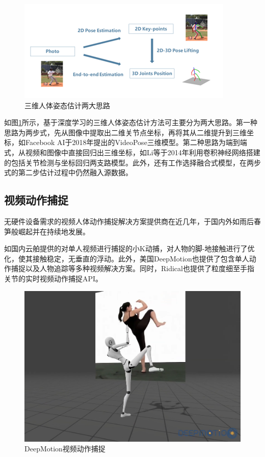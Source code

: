 \begin{figure}[h]
	\centering
	\includegraphics[scale=0.8]{figures/6.png}
	\caption{三维人体姿态估计两大思路}
	\label{fig:f6}
\end{figure}

如图\ref{fig:f6}所示，基于深度学习的三维人体姿态估计方法可主要分为两大思路。第一种思路为两步式，先从图像中提取出二维关节点坐标，再将其从二维提升到三维坐标，如Facebook AI于2018年提出的VideoPose三维模型。第二种思路为端到端式，从视频和图像中直接回归出三维坐标，如Li等于2014年利用卷积神经网络搭建的包括关节检测与坐标回归两支路模型。此外，还有工作选择融合式模型，在两步式的第二步估计过程中仍然融入源数据。

\subsection{视频动作捕捉}{}
无硬件设备需求的视频人体动作捕捉解决方案提供商在近几年，于国内外如雨后春笋般崛起并在持续地发展。

如国内云舶提供的对单人视频进行捕捉的小K动捕，对人物的脚-地接触进行了优化，使其接触稳定，无垂直的浮动。此外，美国DeepMotion也提供了包含单人动作捕捉以及人物追踪等多种视频解决方案。同时，Ridical也提供了粒度细至手指关节的实时视频动作捕捉API。

\begin{figure}[h]
	\centering
	\includegraphics[scale=0.4]{figures/7.png}
	\caption{DeepMotion视频动作捕捉}
	\label{fig:f7}
\end{figure}



